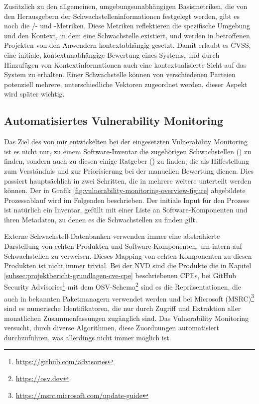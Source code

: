 Zusätzlich zu den allgemeinen, umgebungsunabhängigen Basismetriken, die von den Herausgebern der Schwachstelleninformationen festgelegt werden, gibt es noch die /- und -Metriken.
Diese Metriken reflektieren die spezifische Umgebung und den Kontext, in dem eine Schwachstelle existiert, und werden in betroffenen Projekten von den Anwendern kontextabhängig gesetzt.
Damit erlaubt es CVSS, eine initiale, kontextunabhängige Bewertung eines Systems, und durch Hinzufügen von Kontextinformationen auch eine kontextualisierte Sicht auf das System zu erhalten.
Einer Schwachstelle können von verschiedenen Parteien potenziell mehrere, unterschiedliche Vektoren zugeordnet werden, dieser Aspekt wird später wichtig.

\subsection{Automatisiertes Vulnerability Monitoring} \label{subsec:projektbericht-grundlagen-vulnerability-monitoring}

Das Ziel des von mir entwickelten bei der {\metaeffekt} eingesetzten Vulnerability Monitoring ist es nicht nur, zu einem Software-Inventar die zugehörigen Schwachstellen () zu finden, sondern auch zu diesen einige Ratgeber () zu finden, die als Hilfestellung zum Verständnis und zur Priorisierung bei der manuellen Bewertung dienen.
Dies passiert hauptsächlich in zwei Schritten, die in mehrere weitere unterteilt werden können.
Der in Grafik \ref{fig:vulnerability-monitoring-overview-figure} abgebildete Prozessablauf wird im Folgenden beschrieben.
Der initiale Input für den Prozess ist natürlich ein Inventar, gefüllt mit einer Liste an Software-Komponenten und ihren Metadaten, zu denen es die Schwachstellen zu finden gilt.

Externe Schwachstell-Datenbanken verwenden immer eine abstrahierte Darstellung von echten Produkten und Software-Komponenten, um intern auf Schwachstellen zu verweisen.
Dieses Mapping von echten Komponenten zu diesen Produkten ist nicht immer trivial.
Bei der NVD sind die Produkte die in Kapitel \ref{subsec:projektbericht-grundlagen-cve-cpe} beschriebenen CPEs, bei GitHub Security Advisories\footnote{\url{https://github.com/advisories}} mit dem OSV-Schema\footnote{\url{https://osv.dev}} sind es die Repräsentationen, die auch in bekannten Paketmanagern verwendet werden und bei Microsoft (MSRC)\footnote{\url{https://msrc.microsoft.com/update-guide}} sind es numerische Identifikatoren, die nur durch Zugriff und Extraktion aller monatlichen Zusammenfassungen zugänglich sind.
Das Vulnerability Monitoring versucht, durch diverse Algorithmen, diese Zuordnungen automatisiert durchzuführen, was allerdings nicht immer möglich ist.

